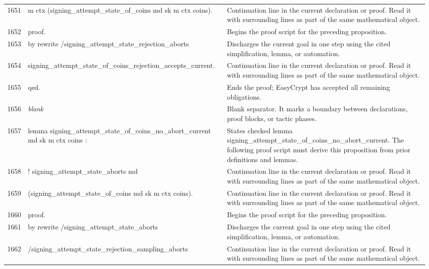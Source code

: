 \documentclass[10pt]{article}
\begin{document}
\begin{longtable}{r L{0.53\textwidth} L{0.37\textwidth}}
1651 & {\ttfamily\scriptsize       m ctx (signing\_attempt\_state\_of\_coins md sk m ctx coins).} & Continuation line in the current declaration or proof.  Read it with surrounding lines as part of the same mathematical object. \\
1652 & {\ttfamily\scriptsize proof.} & Begins the proof script for the preceding proposition. \\
1653 & {\ttfamily\scriptsize by rewrite /signing\_attempt\_state\_rejection\_aborts} & Discharges the current goal in one step using the cited simplification, lemma, or automation. \\
1654 & {\ttfamily\scriptsize            signing\_attempt\_state\_of\_coins\_rejection\_accepts\_current.} & Continuation line in the current declaration or proof.  Read it with surrounding lines as part of the same mathematical object. \\
1655 & {\ttfamily\scriptsize qed.} & Ends the proof; EasyCrypt has accepted all remaining obligations. \\
1656 & {\ttfamily\scriptsize \emph{blank}} & Blank separator.  It marks a boundary between declarations, proof blocks, or tactic phases. \\
1657 & {\ttfamily\scriptsize lemma signing\_attempt\_state\_of\_coins\_no\_abort\_current md sk m ctx coins :} & States checked lemma signing\_attempt\_state\_of\_coins\_no\_abort\_current.  The following proof script must derive this proposition from prior definitions and lemmas. \\
1658 & {\ttfamily\scriptsize   ! signing\_attempt\_state\_aborts md} & Continuation line in the current declaration or proof.  Read it with surrounding lines as part of the same mathematical object. \\
1659 & {\ttfamily\scriptsize       (signing\_attempt\_state\_of\_coins md sk m ctx coins).} & Continuation line in the current declaration or proof.  Read it with surrounding lines as part of the same mathematical object. \\
1660 & {\ttfamily\scriptsize proof.} & Begins the proof script for the preceding proposition. \\
1661 & {\ttfamily\scriptsize by rewrite /signing\_attempt\_state\_aborts} & Discharges the current goal in one step using the cited simplification, lemma, or automation. \\
1662 & {\ttfamily\scriptsize            /signing\_attempt\_state\_rejection\_sampling\_aborts} & Continuation line in the current declaration or proof.  Read it with surrounding lines as part of the same mathematical object. \\

\end{longtable}
\end{document}
